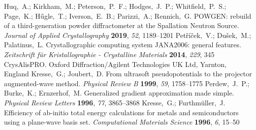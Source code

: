 \documentclass[journal=cmatex,manuscript=article]{achemso}
\begin{document}
\begin{mcitethebibliography}{73}
	\EndOfBibitem
	Huq,~A.; Kirkham,~M.; Peterson,~P.~F.; Hodges,~J.~P.; Whitfield,~P.~S.;
	Page,~K.; H{\H{u}}gle,~T.; Iverson,~E.~B.; Parizzi,~A.; Rennich,~G. {POWGEN}:
	rebuild of a third-generation powder diffractometer at the {S}pallation
	{N}eutron {S}ource. \emph{Journal of Applied Crystallography} \textbf{2019},
	\emph{52}, 1189--1201\relax
	\mciteBstWouldAddEndPuncttrue
	\mciteSetBstMidEndSepPunct{\mcitedefaultmidpunct}
	{\mcitedefaultendpunct}{\mcitedefaultseppunct}\relax
	\EndOfBibitem
	Pet{\v{r}}{\'{i}}{\v{c}}ek,~V.; Du{\v{s}}ek,~M.; Palatinus,~L. Crystallographic
	computing system {JANA}2006: general features. \emph{Zeitschrift für
		Kristallographie - Crystalline Materials} \textbf{2014}, \emph{229},
	345\relax
	\mciteBstWouldAddEndPuncttrue
	\mciteSetBstMidEndSepPunct{\mcitedefaultmidpunct}
	{\mcitedefaultendpunct}{\mcitedefaultseppunct}\relax
	\EndOfBibitem
	{CrysAlisPRO}. Oxford Diffraction/Agilent Technologies UK Ltd, Yarnton,
	England\relax
	\mciteBstWouldAddEndPuncttrue
	\mciteSetBstMidEndSepPunct{\mcitedefaultmidpunct}
	{\mcitedefaultendpunct}{\mcitedefaultseppunct}\relax
	\EndOfBibitem
	Kresse,~G.; Joubert,~D. From ultrasoft pseudopotentials to the projector
	augmented-wave method. \emph{Physical Review B} \textbf{1999}, \emph{59},
	1758--1775\relax
	\mciteBstWouldAddEndPuncttrue
	\mciteSetBstMidEndSepPunct{\mcitedefaultmidpunct}
	{\mcitedefaultendpunct}{\mcitedefaultseppunct}\relax
	\EndOfBibitem
	Perdew,~J.~P.; Burke,~K.; Ernzerhof,~M. Generalized gradient approximation made
	simple. \emph{Physical Review Letters} \textbf{1996}, \emph{77},
	3865--3868\relax
	\mciteBstWouldAddEndPuncttrue
	\mciteSetBstMidEndSepPunct{\mcitedefaultmidpunct}
	{\mcitedefaultendpunct}{\mcitedefaultseppunct}\relax
	\EndOfBibitem
	Kresse,~G.; Furthm\"uller,~J. Efficiency of ab-initio total energy calculations
	for metals and semiconductors using a plane-wave basis set.
	\emph{Computational Materials Science} \textbf{1996}, \emph{6}, 15--50\relax
	\mciteBstWouldAddEndPuncttrue

\end{mcitethebibliography}
\end{document}
